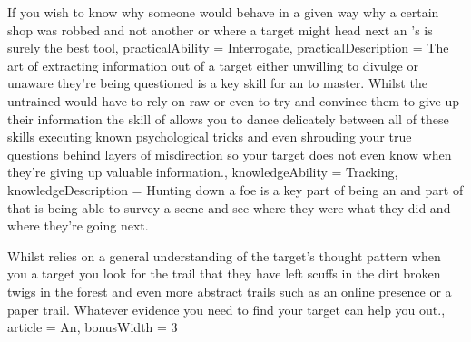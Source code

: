 {If you wish to know why someone would behave in a given way\comma{} why a certain shop was robbed and not another\comma{} or where a target might head next \minus{} an \name{}'s \imp{\innateAbility} is surely the best tool,
	practicalAbility = Interrogate,
	practicalDescription = The art of extracting information out of a target\comma{} either unwilling to divulge or unaware they're being questioned\comma{} is a key skill for an \bname{} to master.   Whilst the untrained would have to rely on raw \comma{} \comma{}  or even  to try and convince them to give up their information\comma{} the skill of  allows you to dance delicately between all of these skills\comma{} executing known psychological tricks and even shrouding your true questions behind layers of misdirection so your target does not even know when they're giving up valuable information.,
	knowledgeAbility = Tracking,
	knowledgeDescription = Hunting down a foe is a key part of being an \bname{}\comma{} and part of that is being able to survey a scene and see where they were\comma{} what they did\comma{} and where they're going next.

Whilst  relies on a general understanding of the target's thought pattern\comma{} when you  a target you look for the trail that they have left \minus{} scuffs in the dirt\comma{} broken twigs in the forest and even more abstract trails such as an online presence or a paper trail. Whatever evidence you need to find your target\comma{}  can help you out.,
	article = An,
	bonusWidth = 3
}

